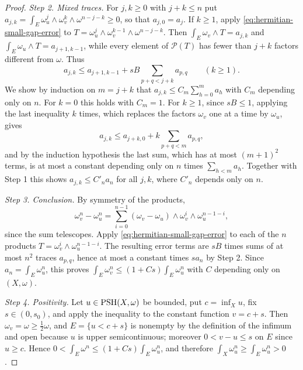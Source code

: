 \begin{proof}
\emph{Step 2. Mixed traces.} For $j,k\geq0$ with $j+k\leq n$ put $a_{j,k}=\int_E\omega_u^j\wedge\omega_v^k\wedge\omega^{n-j-k}\geq0$, so that $a_{j,0}=a_j$. If $k\geq1$, apply \eqref{eq:hermitian-small-gap-error} to $T=\omega_u^j\wedge\omega_v^{k-1}\wedge\omega^{n-j-k}$. Then $\int_E\omega_v\wedge T=a_{j,k}$ and $\int_E\omega_u\wedge T=a_{j+1,k-1}$, while every element of $\mathcal P(T)$ has fewer than $j+k$ factors different from $\omega$. Thus
\[
 a_{j,k}\leq a_{j+1,k-1}+sB\sum_{p+q<j+k}a_{p,q}\qquad(k\geq1).
\]
We show by induction on $m=j+k$ that $a_{j,k}\leq C_m\sum_{h=0}^ma_h$ with $C_m$ depending only on $n$. For $k=0$ this holds with $C_m=1$. For $k\geq1$, since $sB\leq1$, applying the last inequality $k$ times, which replaces the factors $\omega_v$ one at a time by $\omega_u$, gives
\[
 a_{j,k}\leq a_{j+k,0}+k\sum_{p+q<m}a_{p,q},
\]
and by the induction hypothesis the last sum, which has at most $(m+1)^2$ terms, is at most a constant depending only on $n$ times $\sum_{h<m}a_h$. Together with Step 1 this shows $a_{j,k}\leq C'_na_n$ for all $j,k$, where $C'_n$ depends only on $n$.

\emph{Step 3. Conclusion.} By symmetry of the products,
\[
 \omega_v^n-\omega_u^n=\sum_{i=0}^{n-1}(\omega_v-\omega_u)\wedge\omega_v^i\wedge\omega_u^{n-1-i},
\]
since the sum telescopes. Apply \eqref{eq:hermitian-small-gap-error} to each of the $n$ products $T=\omega_v^i\wedge\omega_u^{n-1-i}$. The resulting error terms are $sB$ times sums of at most $n^2$ traces $a_{p,q}$, hence at most a constant times $sa_n$ by Step 2. Since $a_n=\int_E\omega_u^n$, this proves $\int_E\omega_v^n\leq(1+Cs)\int_E\omega_u^n$ with $C$ depending only on $(X,\omega)$.

\emph{Step 4. Positivity.} Let $u\in\mathrm{PSH}(X,\omega)$ be bounded, put $c=\inf_Xu$, fix $s\in(0,s_0)$, and apply the inequality to the constant function $v=c+s$. Then $\omega_v=\omega\geq\tfrac12\omega$, and $E=\{u<c+s\}$ is nonempty by the definition of the infimum and open because $u$ is upper semicontinuous; moreover $0<v-u\leq s$ on $E$ since $u\geq c$. Hence $0<\int_E\omega^n\leq(1+Cs)\int_E\omega_u^n$, and therefore $\int_X\omega_u^n\geq\int_E\omega_u^n>0$.
\end{proof}

